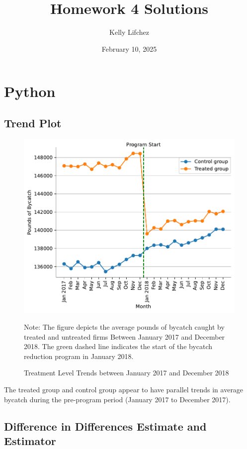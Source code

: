 \documentclass{article}
\title{Homework 4 Solutions}
\author{Kelly Lifchez}
\date{February 10, 2025}
\begin{document}
  
\maketitle


\section{Python}

\subsection{Trend Plot} 

\begin{figure}[!ht]
    \centering
    \caption{Treatment Level Trends between January 2017 and December 2018}
    \includegraphics[scale = 0.75]{trend_plot.pdf}
    \begin{minipage}{0.72\textwidth}
        \footnotesize Note: The figure depicts the average pounds of bycatch caught by treated and untreated firms Between January 2017 and December 2018. The green dashed line indicates the start of the bycatch reduction program in January 2018. 
    \end{minipage}
    \label{fig:ame_plot}
\end{figure}

The treated group and control group appear to have parallel trends in average bycatch during the pre-program period (January 2017 to December 2017). 

\newpage
\subsection{Difference in Differences Estimate and Estimator}
\end{document}
